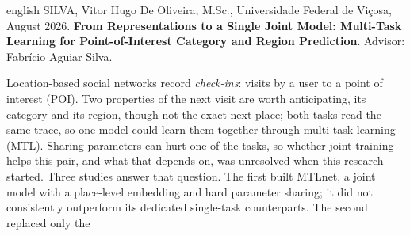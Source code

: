     \begin{resumo}[Abstract]
        \begin{otherlanguage*}{english}
            \singlespacing
            SILVA, Vitor Hugo De Oliveira, M.Sc., Universidade Federal de Viçosa, August 2026.
            \textbf{From Representations to a Single Joint Model: Multi-Task Learning for Point-of-Interest Category and Region Prediction}. Advisor: Fabrício Aguiar Silva.
            \vspace{\onelineskip}

            \noindent Location-based social networks record \emph{check-ins}: visits by a user
            to a point of interest (POI). Two properties of the next visit are worth
            anticipating, its category and its region, though not the exact next place; both
            tasks read the same trace, so one model could learn them together through multi-task
            learning (MTL). Sharing parameters can hurt one of the tasks, so whether joint
            training helps this pair, and what that depends on, was unresolved when this research
            started. Three studies answer that question. The first built MTLnet, a joint model
            with a place-level embedding and hard parameter sharing; it did not consistently
            outperform its dedicated single-task counterparts. The second replaced only the

\end{otherlanguage*}
\end{resumo}
